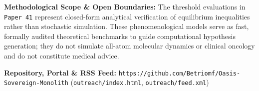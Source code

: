 \documentclass[11pt,a4paper]{article}
\begin{document}
\vspace{6pt}
\noindent\textbf{Methodological Scope & Open Boundaries:}
The threshold evaluations in \texttt{Paper 41} represent closed-form analytical verification of equilibrium inequalities rather than stochastic simulation. These phenomenological models serve as fast, formally audited theoretical benchmarks to guide computational hypothesis generation; they do not simulate all-atom molecular dynamics or clinical oncology and do not constitute medical advice.

\vspace{4pt}
\noindent\textbf{Repository, Portal & RSS Feed:} \texttt{https://github.com/Betriomf/Oasis-Sovereign-Monolith} (\texttt{outreach/index.html}, \texttt{outreach/feed.xml})
\end{document}

